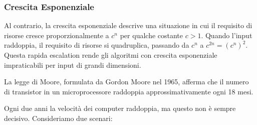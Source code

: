 \subsubsection{Crescita Esponenziale}
Al contrario, la crescita esponenziale descrive una situazione in cui il requisito di risorse cresce
proporzionalmente a \(c^n\) per qualche costante \(c > 1\). Quando l'input raddoppia, il requisito di
risorse si quadruplica, passando da \(c^n\) a \(c^{2n} = (c^n)^2\). Questa rapida escalation rende gli
algoritmi con crescita esponenziale impraticabili per input di grandi dimensioni.

\begin{figure}[H]
    \centering
\end{figure}
\begin{tcolorbox}[title=Legge di Moore]
    La legge di Moore, formulata da Gordon Moore nel 1965, afferma che il numero di transistor
    in un microprocessore raddoppia approssimativamente ogni 18 mesi.
\end{tcolorbox}
Ogni due anni la velocità dei computer raddoppia, ma questo non è sempre decisivo.
Consideriamo due scenari:
    
